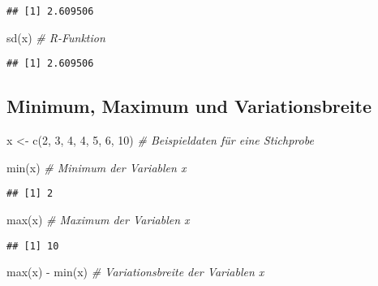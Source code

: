 \documentclass[
]{book}
\newenvironment{Shaded}{\begin{snugshade}}{\end{snugshade}}
\newcommand{\CommentTok}[1]{\textcolor[rgb]{0.56,0.35,0.01}{\textit{#1}}}
\newcommand{\DecValTok}[1]{\textcolor[rgb]{0.00,0.00,0.81}{#1}}
\newcommand{\FunctionTok}[1]{\textcolor[rgb]{0.00,0.00,0.00}{#1}}
\newcommand{\NormalTok}[1]{#1}
\newcommand{\OtherTok}[1]{\textcolor[rgb]{0.56,0.35,0.01}{#1}}
\newcommand{\SpecialCharTok}[1]{\textcolor[rgb]{0.00,0.00,0.00}{#1}}
\begin{document}
\begin{verbatim}
## [1] 2.609506
\end{verbatim}

\begin{Shaded}
\begin{Highlighting}[]
\FunctionTok{sd}\NormalTok{(x)                             }\CommentTok{\# R{-}Funktion}
\end{Highlighting}
\end{Shaded}

\begin{verbatim}
## [1] 2.609506
\end{verbatim}

\hypertarget{minimum-maximum-und-variationsbreite}{%
\subsection{Minimum, Maximum und Variationsbreite}\label{minimum-maximum-und-variationsbreite}}

\begin{Shaded}
\begin{Highlighting}[]
\NormalTok{x }\OtherTok{\textless{}{-}} \FunctionTok{c}\NormalTok{(}\DecValTok{2}\NormalTok{, }\DecValTok{3}\NormalTok{, }\DecValTok{4}\NormalTok{, }\DecValTok{4}\NormalTok{, }\DecValTok{5}\NormalTok{, }\DecValTok{6}\NormalTok{, }\DecValTok{10}\NormalTok{)      }\CommentTok{\# Beispieldaten für eine Stichprobe}

\FunctionTok{min}\NormalTok{(x)                            }\CommentTok{\# Minimum der Variablen x}
\end{Highlighting}
\end{Shaded}

\begin{verbatim}
## [1] 2
\end{verbatim}

\begin{Shaded}
\begin{Highlighting}[]
\FunctionTok{max}\NormalTok{(x)                            }\CommentTok{\# Maximum der Variablen x}
\end{Highlighting}
\end{Shaded}

\begin{verbatim}
## [1] 10
\end{verbatim}

\begin{Shaded}
\begin{Highlighting}[]
\FunctionTok{max}\NormalTok{(x) }\SpecialCharTok{{-}} \FunctionTok{min}\NormalTok{(x)                   }\CommentTok{\# Variationsbreite der Variablen x}
\end{Highlighting}
\end{Shaded}
\end{document}
